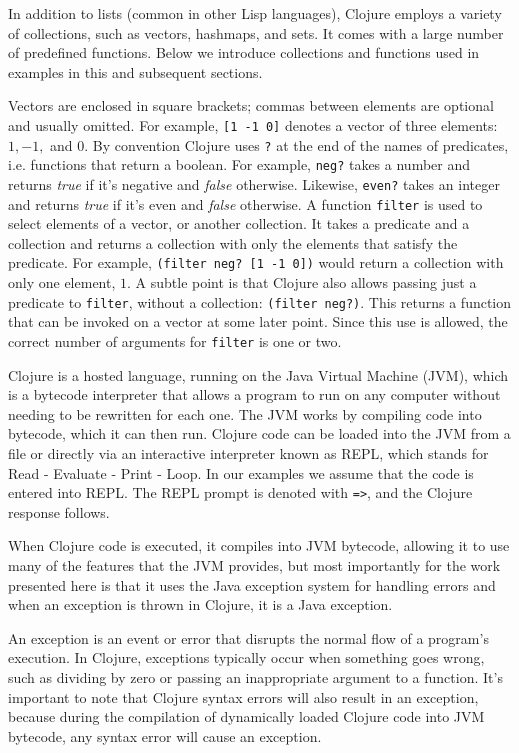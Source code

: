 \documentclass[12pt]{article}
\newcommand{\comment}[1]{{\bf \tt  {#1}}}
\newcommand{\emcomment}[1]{\textcolor{ForestGreen}{\comment{Elena: {#1}}}}
\begin{document}
In addition to lists (common in other Lisp languages), Clojure employs a variety of collections, such as vectors, hashmaps, and sets. 
It comes with a large number of predefined functions. Below we introduce collections and functions used in examples in this and subsequent sections. 
 
Vectors are enclosed in square brackets; commas between elements are optional and usually omitted. 
For example,  \texttt{[1 -1 0]} denotes a vector of three elements: $1, -1,$ and $0$. 
By convention Clojure uses \texttt{?} at the end of the names of predicates, i.e. functions that return a boolean. 
For example, \texttt{neg?} takes a number and returns \textit{true} if it's negative and \textit{false} otherwise.
Likewise, \texttt{even?} takes an integer and returns \textit{true} if it's even and \textit{false} otherwise.
A function \texttt{filter} is used to select elements of a vector, or another collection. 
It takes a predicate and  a collection and returns a collection with only the elements that satisfy the predicate. 
For example, \texttt{(filter neg? [1 -1 0])} would return a collection with only one element, $1$. 
A subtle point is that Clojure also allows passing just a predicate to \texttt{filter}, without a collection:  \texttt{(filter neg?)}. This returns a function that can be invoked on a vector at some later point. 
Since this use is allowed, the correct number of arguments for \texttt{filter} is one or two. 

	Clojure is a hosted language, running on the Java Virtual Machine (JVM), which is a bytecode interpreter that allows a program to run on any computer without needing to be rewritten for each one. 
	The JVM works by compiling code into bytecode, which it can then run. 
Clojure code can be loaded into the JVM from a file or directly via an interactive interpreter known as REPL, which stands for Read - Evaluate - Print - Loop. In our examples we assume that the code is entered into REPL. 
The REPL prompt is denoted with \texttt{=>}, and the Clojure response follows. 

When Clojure code is executed, it compiles into JVM bytecode, allowing it to use many of the features that the JVM provides, 
	but most importantly for the work presented here is that it uses the Java exception system for handling errors and when an exception is thrown in Clojure, it is a Java exception.

    
   An exception is an event or error that disrupts the normal flow of a program's execution. In Clojure, exceptions typically occur when something goes wrong, such as dividing by 
   zero or passing an inappropriate argument to a function. It's important to note that Clojure syntax errors will also result in an exception, because during the compilation of dynamically loaded Clojure code into JVM bytecode, 
   any syntax error will 
cause an exception.
\end{document}
